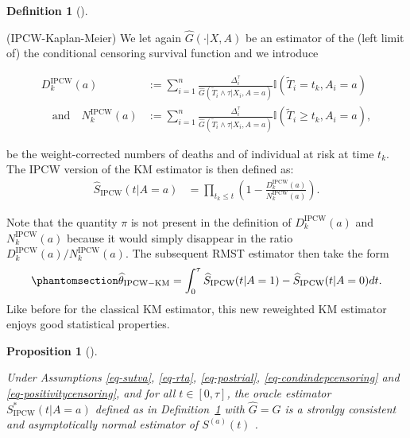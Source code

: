\documentclass[
  11pt,
  a4paper,
]{article}
\theoremstyle{plain}
\theoremstyle{plain}
\theoremstyle{plain}
\newtheorem{proposition}{Proposition}[section]
\theoremstyle{definition}
\newtheorem{definition}{Definition}[section]
\theoremstyle{remark}
\begin{document}
\begin{definition}[]\protect\hypertarget{def-ipcwkm}{}\label{def-ipcwkm}

(IPCW-Kaplan-Meier) We let again \(\widehat G(\cdot|X,A)\) be an
estimator of the (left limit of) the conditional censoring survival
function and we introduce

\begin{align*}
D_k^{\mathrm{IPCW}}(a) &:= \sum_{i=1}^n \frac{\Delta_i^\tau}{\widehat G(\widetilde T_i \wedge\tau | X_i,A=a)} \mathbb{I}(\widetilde T_i = t_k, A_i=a) \\
\quad\text{and}\quad N^{\mathrm{IPCW}}_k(a) &:= \sum_{i=1}^n \frac{\Delta_i^\tau}{\widehat G(\widetilde T_i \wedge\tau | X_i,A=a)} \mathbb{I}(\widetilde T_i \geqslant t_k, A_i=a),
\end{align*}

be the weight-corrected numbers of deaths and of individual at risk at
time \(t_k\). The IPCW version of the KM estimator is then defined as:
\[
\begin{aligned}
\widehat{S}_{\mathrm{IPCW}}(t | A=a) &= \prod_{t_k \leqslant t}\left(1-\frac{D_k^{\mathrm{IPCW}}(a)}{N_k^{\mathrm{IPCW}}(a)}\right). 
\end{aligned}
\]

\end{definition}

Note that the quantity \(\pi\) is not present in the definition of
\(D_k^{\mathrm{IPCW}}(a)\) and \(N_k^{\mathrm{IPCW}}(a)\) because it
would simply disappear in the ratio
\(D_k^{\mathrm{IPCW}}(a)/N_k^{\mathrm{IPCW}}(a)\). The subsequent RMST
estimator then take the form
\begin{equation}\phantomsection\label{eq-thetaIPCWKM}{
\widehat{\theta}_{\mathrm{IPCW-KM}} = \int_{0}^{\tau}\widehat{S}_{\mathrm{IPCW}}(t|A=1)-\widehat{S}_{\mathrm{IPCW}}(t|A=0)dt.
}\end{equation} Like before for the classical KM estimator, this new
reweighted KM estimator enjoys good statistical properties.

\begin{proposition}[]\protect\hypertarget{prp-ipcwkm}{}\label{prp-ipcwkm}

Under Assumptions
\ref{eq-sutva}, \ref{eq-rta}, \ref{eq-postrial}, \ref{eq-condindepcensoring}
and \ref{eq-positivitycensoring}, and for all \(t \in [0,\tau]\), the
oracle estimator \(S^*_{\mathrm{IPCW}}(t|A=a)\) defined as in
Definition~\ref{def-ipcwkm} with \(\widehat G = G\) is a stronlgy
consistent and asymptotically normal estimator of \(S^{(a)}(t)\) .

\end{proposition}
\end{document}
